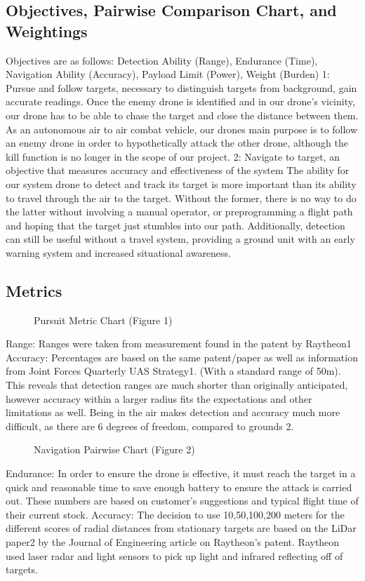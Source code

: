 \documentclass[10pt]{article}
\begin{document}
\subsection{Objectives, Pairwise Comparison Chart, and Weightings}
Objectives are as follows: 
Detection Ability (Range), Endurance (Time), Navigation Ability (Accuracy), Payload Limit (Power), Weight (Burden)
1: Pursue and follow targets, necessary to distinguish targets from background, gain accurate readings.  
Once the enemy drone is identified and in our drone's vicinity, our drone has to be able to chase the target and close the distance between them.  As an autonomous air to air combat vehicle, our drones main purpose is to follow an enemy drone in order to hypothetically attack the other drone, although the kill function is no longer in the scope of our project.  
2: Navigate to target, an objective that measures accuracy and effectiveness of the system
The ability for our system drone to detect and track its target is more important than its ability to travel through the air to the target. Without the former, there is no way to do the latter without involving a manual operator, or preprogramming a flight path and hoping that the target just stumbles into our path. Additionally, detection can still be useful without a travel system, providing a ground unit with an early warning system and increased situational awareness.

\subsection{Metrics} 
\begin{figure}
\caption{Pursuit Metric Chart (Figure 1)}
\label{fig:1}
\end{figure}
Range: Ranges were taken from measurement found in the patent by Raytheon1
Accuracy: Percentages are based on the same patent/paper as well as information from Joint Forces Quarterly UAS Strategy1. (With a standard range of 50m). This reveals that detection ranges are much shorter than originally anticipated, however accuracy within a larger radius fits the expectations and other limitations as well. Being in the air makes detection and accuracy much more difficult, as there are 6 degrees of freedom, compared to grounds 2. 

\begin{figure}
\caption{Navigation Pairwise Chart (Figure 2)}
\label{fig:2}
\end{figure}
Endurance: In order to ensure the drone is effective, it must reach the target in a quick and reasonable time to save enough battery to ensure the attack is carried out.  These numbers are based on customer’s suggestions and typical flight time of their current stock.
Accuracy: The decision to use 10,50,100,200 meters for the different scores of radial distances from stationary targets are based on the LiDar paper2 by the Journal of Engineering article on Raytheon’s patent. Raytheon used laser radar and light sensors to pick up light and infrared reflecting off of targets.  
\end{document}
